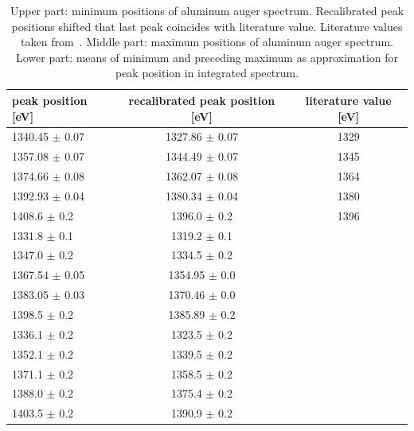 \documentclass[a4paper,10pt]{scrartcl}
\begin{document}
\begin{table}
\begin{center}
\begin{tabular}{lcc}
\toprule
peak position  [eV]                  & recalibrated peak position [eV]      & literature value [eV]\\
\midrule
1340.45 $\pm$ 0.07                     & 1327.86 $\pm$ 0.07                     & 1329 \\
1357.08 $\pm$ 0.07                     & 1344.49 $\pm$ 0.07                     & 1345 \\
1374.66 $\pm$ 0.08                     & 1362.07 $\pm$ 0.08                     & 1364 \\
1392.93 $\pm$ 0.04                     & 1380.34 $\pm$ 0.04                     & 1380 \\
1408.6\phantom{0} $\pm$ 0.2\phantom{0} & 1396.0\phantom{0} $\pm$ 0.2\phantom{0} & 1396 \\
\midrule
1331.8\phantom{0} $\pm$ 0.1\phantom{0} & 1319.2\phantom{0} $\pm$ 0.1\phantom{0} & \\
1347.0\phantom{0} $\pm$ 0.2\phantom{0} & 1334.5\phantom{0} $\pm$ 0.2\phantom{0} & \\
1367.54 $\pm$ 0.05                     & 1354.95 $\pm$ 0.0                      & \\
1383.05 $\pm$ 0.03                     & 1370.46 $\pm$ 0.0                      & \\
1398.5\phantom{0} $\pm$ 0.2\phantom{0} & 1385.89 $\pm$ 0.2                      & \\
\midrule
1336.1\phantom{0} $\pm$ 0.2\phantom{0} & 1323.5\phantom{0} $\pm$ 0.2\phantom{0} & \\
1352.1\phantom{0} $\pm$ 0.2\phantom{0} & 1339.5\phantom{0} $\pm$ 0.2\phantom{0} & \\
1371.1\phantom{0} $\pm$ 0.2\phantom{0} & 1358.5\phantom{0} $\pm$ 0.2\phantom{0} & \\
1388.0\phantom{0} $\pm$ 0.2\phantom{0} & 1375.4\phantom{0} $\pm$ 0.2\phantom{0} & \\
1403.5\phantom{0} $\pm$ 0.2\phantom{0} & 1390.9\phantom{0} $\pm$ 0.2\phantom{0} & \\
\bottomrule
\end{tabular}
\end{center}
\par
\caption{Upper part: minimum positions of aluminum auger spectrum. Recalibrated peak positions shifted that last peak coincides with literature value. Literature values taken from~\cite{handbook}. Middle part: maximum positions of aluminum auger spectrum. Lower part: means of minimum and preceding maximum as approximation for peak position in integrated spectrum.\label{tab:augerpeaks}}
\end{table}
\end{document}
